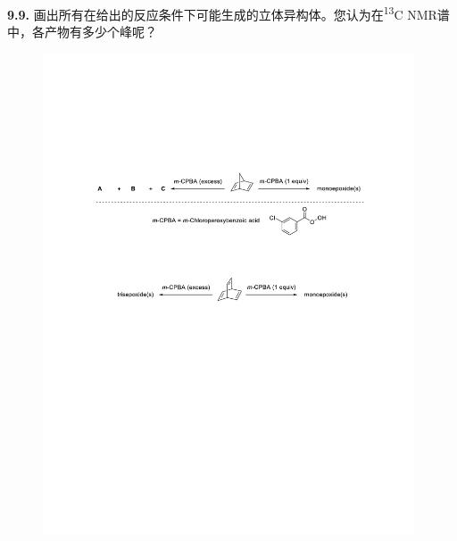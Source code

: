 \noindent\textbf{9.9.}
画出所有在给出的反应条件下可能生成的立体异构体。您认为在\textsuperscript{13}C
NMR谱中，各产物有多少个峰呢？

\begin{figure}[h!]
	\centering
	\includegraphics[width=11cm]{./pic/t9-6.pdf}
\end{figure}
